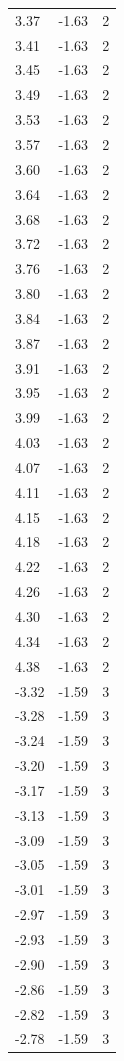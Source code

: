 \begin{longtable}{lrr}
  3.37 & -1.63 & 2 \\
  3.41 & -1.63 & 2 \\
  3.45 & -1.63 & 2 \\
  3.49 & -1.63 & 2 \\
  3.53 & -1.63 & 2 \\
  3.57 & -1.63 & 2 \\
  3.60 & -1.63 & 2 \\
  3.64 & -1.63 & 2 \\
  3.68 & -1.63 & 2 \\
  3.72 & -1.63 & 2 \\
  3.76 & -1.63 & 2 \\
  3.80 & -1.63 & 2 \\
  3.84 & -1.63 & 2 \\
  3.87 & -1.63 & 2 \\
  3.91 & -1.63 & 2 \\
  3.95 & -1.63 & 2 \\
  3.99 & -1.63 & 2 \\
  4.03 & -1.63 & 2 \\
  4.07 & -1.63 & 2 \\
  4.11 & -1.63 & 2 \\
  4.15 & -1.63 & 2 \\
  4.18 & -1.63 & 2 \\
  4.22 & -1.63 & 2 \\
  4.26 & -1.63 & 2 \\
  4.30 & -1.63 & 2 \\
  4.34 & -1.63 & 2 \\
  4.38 & -1.63 & 2 \\
  -3.32 & -1.59 & 3 \\
  -3.28 & -1.59 & 3 \\
  -3.24 & -1.59 & 3 \\
  -3.20 & -1.59 & 3 \\
  -3.17 & -1.59 & 3 \\
  -3.13 & -1.59 & 3 \\
  -3.09 & -1.59 & 3 \\
  -3.05 & -1.59 & 3 \\
  -3.01 & -1.59 & 3 \\
  -2.97 & -1.59 & 3 \\
  -2.93 & -1.59 & 3 \\
  -2.90 & -1.59 & 3 \\
  -2.86 & -1.59 & 3 \\
  -2.82 & -1.59 & 3 \\
  -2.78 & -1.59 & 3 \\

\end{longtable}
